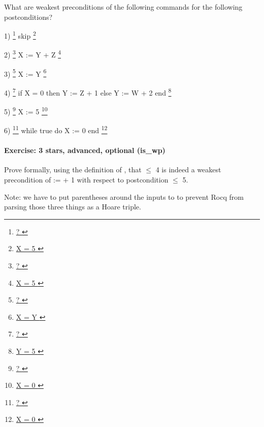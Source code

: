 \documentclass[12pt]{report}
\begin{document}
    What are weakest preconditions of the following commands
    for the following postconditions?


  1) \footnote{\url{ ? }}  skip  \footnote{\url{ X = 5 }}


  2) \footnote{\url{ ? }}  X := Y + Z \footnote{\url{ X = 5 }}


  3) \footnote{\url{ ? }}  X := Y  \footnote{\url{ X = Y }}


  4) \footnote{\url{ ? }}
     if X = 0 then Y := Z + 1 else Y := W + 2 end
     \footnote{\url{ Y = 5 }}


  5) \footnote{\url{ ? }}
     X := 5
     \footnote{\url{ X = 0 }}


  6) \footnote{\url{ ? }}
     while true do X := 0 end
     \footnote{\url{ X = 0 }}

\begin{coqdoccode}
\coqdocemptyline
\end{coqdoccode}
\paragraph{Exercise: 3 stars, advanced, optional (is\_wp)}




    Prove formally, using the definition of , that  \ensuremath{\le} 4
    is indeed a weakest precondition of  :=  + 1 with respect to
    postcondition  \ensuremath{\le} 5.


    Note: we have to put parentheses around the inputs to  to
    prevent Rocq from parsing those three things as a Hoare triple.
 
\end{document}
